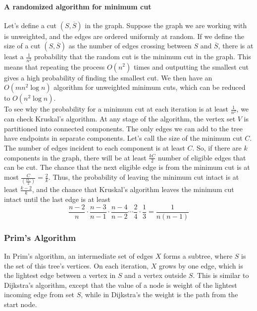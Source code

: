 \paragraph{A randomized algorithm for minimum cut}
Let's define a cut $(S, \overline{S})$ in the graph.
Suppose the graph we are working with is unweighted, and the edges are ordered uniformly at random.
If we define the size of a cut $(S, \overline{S} )$ as the number of edges crossing between $S$ and $\overline{S} $, there is at least a $\frac{1}{n^2}$ probability that the random cut is the minimum cut in the graph.
This means that repeating the process $O(n^2)$ times and outputting the smallest cut gives a high probability of finding the smallest cut.
We then have an $O(mn^2 \log n)$ algorithm for unweighted minimum cuts, which can be reduced to $O(n^2 \log n)$.\\
To see why the probability for a minimum cut at each iteration is at least $\frac{1}{n^2}$, we can check Kruskal's algorithm.
At any stage of the algorithm, the vertex set $V$ is partitioned into connected components.
The only edges we can add to the tree have endpoints in separate components.
Let's call the size of the minimum cut $C$.
The number of edges incident to each component is at least $C$.
So, if there are $k$ components in the graph, there will be at least $\frac{kC}{2}$ number of eligible edges that can be cut.
The chance that the next eligible edge is from the minimum cut is at most $\frac{C}{(\frac{kC}{2})} = \frac{2}{k}$.
Thus, the probability of leaving the minimum cut intact is at least $\frac{k-2}{k}$, and the chance that Kruskal's algorithm leaves the minimum cut intact until the last edge is at least $$\frac{n-2}{n} \cdot \frac{n-3}{n-1} \cdot \frac{n-4}{n-2} \cdots \frac{2}{4} \cdot \frac{1}{3} = \frac{1}{n(n-1)}$$

\subsubsection{Prim's Algorithm}
In Prim's algorithm, an intermediate set of edges $X$ forms a subtree, where $S$ is the set of this tree's vertices.
On each iteration, $X$ grows by one edge, which is the lightest edge between a vertex in $S$ and a vertex outside $S$.
This is similar to Dijkstra's algorithm, except that the value of a node is weight of the lightest incoming edge from set $S$, while in Dijkstra's the weight is the path from the start node.

